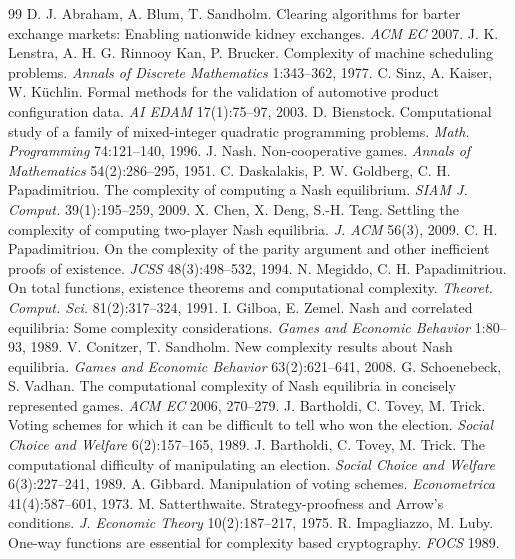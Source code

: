 \documentclass[a4paper,12pt]{article}
\theoremstyle{definition}
\begin{document}
\begin{thebibliography}{99}
 D. J. Abraham, A. Blum, T. Sandholm. Clearing algorithms for barter exchange markets: Enabling nationwide kidney exchanges. \emph{ACM EC} 2007.
 J. K. Lenstra, A. H. G. Rinnooy Kan, P. Brucker. Complexity of machine scheduling problems. \emph{Annals of Discrete Mathematics} 1:343--362, 1977.
 C. Sinz, A. Kaiser, W. Küchlin. Formal methods for the validation of automotive product configuration data. \emph{AI EDAM} 17(1):75--97, 2003.
 D. Bienstock. Computational study of a family of mixed-integer quadratic programming problems. \emph{Math. Programming} 74:121--140, 1996.
 J. Nash. Non-cooperative games. \emph{Annals of Mathematics} 54(2):286--295, 1951.
 C. Daskalakis, P. W. Goldberg, C. H. Papadimitriou. The complexity of computing a Nash equilibrium. \emph{SIAM J. Comput.} 39(1):195--259, 2009.
 X. Chen, X. Deng, S.-H. Teng. Settling the complexity of computing two-player Nash equilibria. \emph{J. ACM} 56(3), 2009.
 C. H. Papadimitriou. On the complexity of the parity argument and other inefficient proofs of existence. \emph{JCSS} 48(3):498--532, 1994.
 N. Megiddo, C. H. Papadimitriou. On total functions, existence theorems and computational complexity. \emph{Theoret. Comput. Sci.} 81(2):317--324, 1991.
 I. Gilboa, E. Zemel. Nash and correlated equilibria: Some complexity considerations. \emph{Games and Economic Behavior} 1:80--93, 1989.
 V. Conitzer, T. Sandholm. New complexity results about Nash equilibria. \emph{Games and Economic Behavior} 63(2):621--641, 2008.
 G. Schoenebeck, S. Vadhan. The computational complexity of Nash equilibria in concisely represented games. \emph{ACM EC} 2006, 270--279.
 J. Bartholdi, C. Tovey, M. Trick. Voting schemes for which it can be difficult to tell who won the election. \emph{Social Choice and Welfare} 6(2):157--165, 1989.
 J. Bartholdi, C. Tovey, M. Trick. The computational difficulty of manipulating an election. \emph{Social Choice and Welfare} 6(3):227--241, 1989.
 A. Gibbard. Manipulation of voting schemes. \emph{Econometrica} 41(4):587--601, 1973.
 M. Satterthwaite. Strategy-proofness and Arrow's conditions. \emph{J. Economic Theory} 10(2):187--217, 1975.
 R. Impagliazzo, M. Luby. One-way functions are essential for complexity based cryptography. \emph{FOCS} 1989.

\end{thebibliography}
\end{document}
